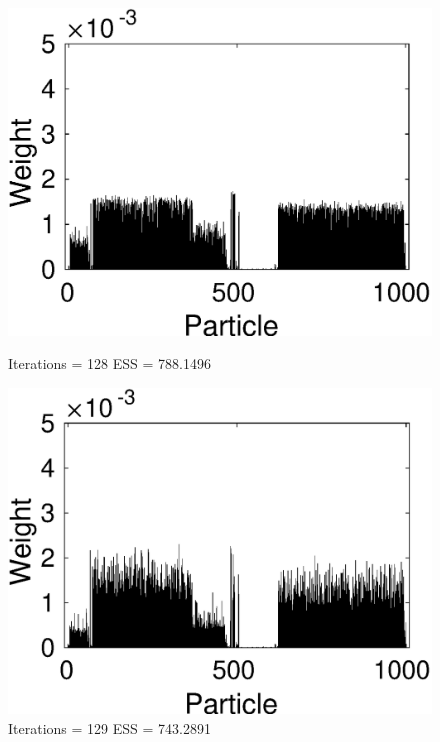 \documentclass[12pt]{article}
\begin{document}
\begin{figure}[!t]
\begin{minipage}{0.5\textwidth}
		\includegraphics[scale = 0.4]{./Figures/128.eps}
		\caption*{Iterations = 128 ESS = 788.1496}
	\end{minipage}%
	\begin{minipage}{0.5\textwidth}
		\centering
		\includegraphics[scale = 0.4]{./Figures/129.eps}
		\caption*{Iterations = 129 ESS = 743.2891}
	\end{minipage}
	\begin{minipage}{0.5\textwidth}
		\centering

\end{minipage}
\end{figure}
\end{document}

